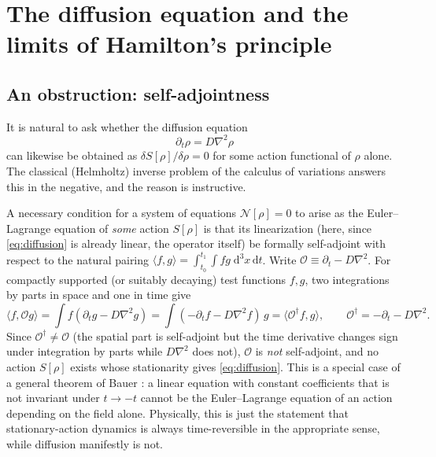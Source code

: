 \documentclass[11pt]{article}
\newcommand{\rd}{\mathrm{d}}
\newcommand{\lap}{\nabla^2}
\begin{document}
\section{The diffusion equation and the limits of Hamilton's principle}
\label{sec:diffusion}

\subsection{An obstruction: self-adjointness}
\label{sec:obstruction}

It is natural to ask whether the diffusion equation
\begin{equation}
\partial_t \rho = D\lap \rho \label{eq:diffusion}
\end{equation}
can likewise be obtained as $\delta S[\rho]/\delta\rho = 0$ for some action functional of $\rho$ alone. The classical (Helmholtz) inverse problem of the calculus of variations answers this in the negative, and the reason is instructive.

A necessary condition for a system of equations $\mathcal N[\rho]=0$ to arise as the Euler--Lagrange equation of \emph{some} action $S[\rho]$ is that its linearization (here, since \eqref{eq:diffusion} is already linear, the operator itself) be formally self-adjoint with respect to the natural pairing $\langle f,g\rangle = \int_{t_0}^{t_1}\!\!\int f g\;\rd^3x\,\rd t$. Write $\mathcal O \equiv \partial_t - D\lap$. For compactly supported (or suitably decaying) test functions $f,g$, two integrations by parts in space and one in time give
\begin{equation}
\langle f, \mathcal O g\rangle = \int f(\partial_t g - D\lap g) = \int (-\partial_t f - D\lap f)\,g = \langle \mathcal O^{\dagger} f, g\rangle, \qquad \mathcal O^{\dagger} = -\partial_t - D\lap.
\end{equation}
Since $\mathcal O^\dagger \neq \mathcal O$ (the spatial part is self-adjoint but the time derivative changes sign under integration by parts while $D\lap$ does not), $\mathcal O$ is \emph{not} self-adjoint, and no action $S[\rho]$ exists whose stationarity gives \eqref{eq:diffusion}. This is a special case of a general theorem of Bauer \cite{Bauer1931}: a linear equation with constant coefficients that is not invariant under $t\to -t$ cannot be the Euler--Lagrange equation of an action depending on the field alone. Physically, this is just the statement that stationary-action dynamics is always time-reversible in the appropriate sense, while diffusion manifestly is not.
\end{document}

